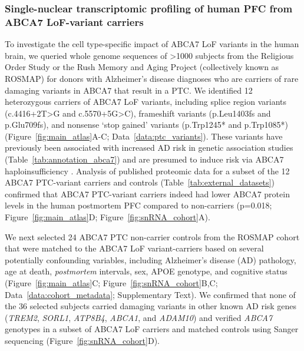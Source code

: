 \subsubsection{Single-nuclear transcriptomic profiling of human PFC from ABCA7 LoF-variant carriers} 
To investigate the cell type-specific impact of ABCA7 LoF variants in the human brain, we queried whole genome sequences of >1000 subjects from the Religious Order Study or the Rush Memory and Aging Project (collectively known as ROSMAP) for donors with Alzheimer’s disease diagnoses who are carriers of rare damaging variants in ABCA7 that result in a PTC. We identified 12 heterozygous carriers of ABCA7 LoF variants, including splice region variants (c.4416+2T>G and c.5570+5G>C), frameshift variants (p.Leu1403fs and p.Glu709fs), and nonsense ‘stop gained’ variants (p.Trp1245* and p.Trp1085*) (Figure~\ref{fig:main_atlas}A-C; Data~\ref{data:ptc_variants}). These variants have previously been associated with increased AD risk in genetic association studies (Table~\ref{tab:annotation_abca7}) \cite{Steinberg2015-mu,Holstege2022-vp} and are presumed to induce risk via ABCA7 haploinsufficiency \cite{Duchateau2024-rf}. Analysis of published proteomic data for a subset of the 12 ABCA7 PTC-variant carriers and controls \cite{Johnson2020-ip} (Table~\ref{tab:external_datasets}) confirmed that ABCA7 PTC-variant carriers indeed had lower ABCA7 protein levels in the human postmortem PFC compared to non-carriers (p=0.018; Figure~\ref{fig:main_atlas}D; Figure~\ref{fig:snRNA_cohort}A). 

We next selected 24 ABCA7 PTC non-carrier controls from the ROSMAP cohort that were matched to the ABCA7 LoF variant-carriers based on several potentially confounding variables, including Alzheimer's disease (AD) pathology, age at death, \textit{postmortem} intervals, sex, APOE genotype, and cognitive status (Figure~\ref{fig:main_atlas}C; Figure~\ref{fig:snRNA_cohort}B,C; Data~\ref{data:cohort_metadata}; Supplementary Text). We confirmed that none of the 36 selected subjects carried damaging variants in other known AD risk genes (\textit{TREM2}, \textit{SORL1}, \textit{ATP8B4}, \textit{ABCA1}, and \textit{ADAM10}) \cite{Holstege2022-vp} and verified \textit{ABCA7} genotypes in a subset of ABCA7 LoF carriers and matched controls using Sanger sequencing (Figure~\ref{fig:snRNA_cohort}D).

